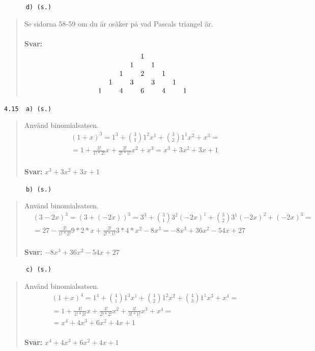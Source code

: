 \documentclass[a4paper]{article}
\newcommand{\tskcol}[1]{\textcolor{tskcol}{#1}}
\begin{document}
	\texttt{\tskcol{~~~~~~d) (s.)}}
	\begin{quotation}
		\noindent
		Se sidorna 58-59 om du är osäker på vad Pascals triangel är.
		\\ \\
		\textbf{Svar:} 
		\[\begin{array}{ccccccccc}
		&    &    &    &  1 &    &    &    &    \cr
		&    &    &  1 &    &  1 &    &    &    \cr
		&    &  1 &    &  2 &    &  1 &    &    \cr
		&  1 &    &  3 &    &  3 &    &  1 &    \cr
		1 &    &  4 &    &  6 &    &  4 &    &  1 \cr
		\end{array}\]
	\end{quotation}
	
	\texttt{\tskcol{4.15~~a) (s.)}}
	\begin{quotation}
		\noindent
		Använd binomialsatsen.
		\begin{align*}
		&(1+x)^3=
		1^3+{3 \choose 1}1^2x^1+{3 \choose 2}1^1x^2+x^3= \\
		&=1+\frac{3!}{1!*2!}x+\frac{3!}{2!*1!}x^2+x^3=
		x^3+3x^2+3x+1
		\end{align*}
		\\
		\textbf{Svar:} $x^3+3x^2+3x+1$
	\end{quotation}
	
	\texttt{\tskcol{~~~~~~b) (s.)}}
	\begin{quotation}
		\noindent
		Använd binomialsatsen.
		\begin{align*}
		&(3-2x)^3=
		(3+(-2x))^3=
		3^3+{3 \choose 1}3^2(-2x)^1+{3 \choose 2}3^1(-2x)^2+(-2x)^3= \\
		&=27-\frac{3!}{1!*2!}9*2*x+\frac{3!}{2!*1!}3*4*x^2-8x^3=
		-8x^3+36x^2-54x+27
		\end{align*}
		\\
		\textbf{Svar:} $-8x^3+36x^2-54x+27$
	\end{quotation}
	
	\texttt{\tskcol{~~~~~~c) (s.)}}
	\begin{quotation}
		\noindent
		Använd binomialsatsen.
		\begin{align*}
		&(1+x)^4=
		1^4+{4 \choose 1}1^3x^1+{4 \choose 2}1^2x^2+{4 \choose 3}1^1x^3+x^4= \\
		&=1+\frac{4!}{1!*3!}x+\frac{4!}{2!*2!}x^2+\frac{4!}{3!*1!}x^3+x^4=\\
		&=x^4+4x^3+6x^2+4x+1
		\end{align*}
		\\
		\textbf{Svar:} $x^4+4x^3+6x^2+4x+1$
	\end{quotation}
	
\end{document}
